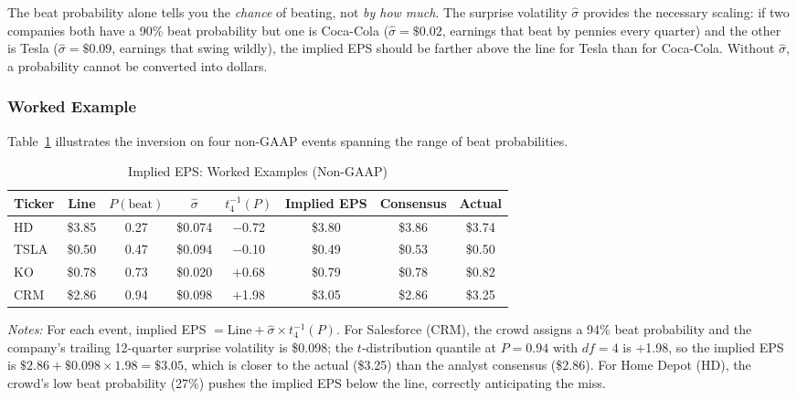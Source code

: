 \documentclass[11pt]{article}
\begin{document}
The beat probability alone tells you the \textit{chance} of beating, not \textit{by how much}. The surprise volatility $\hat{\sigma}$ provides the necessary scaling: if two companies both have a 90\% beat probability but one is Coca-Cola ($\hat{\sigma} = \$0.02$, earnings that beat by pennies every quarter) and the other is Tesla ($\hat{\sigma} = \$0.09$, earnings that swing wildly), the implied EPS should be farther above the line for Tesla than for Coca-Cola. Without $\hat{\sigma}$, a probability cannot be converted into dollars.

\subsubsection{Worked Example}

Table~\ref{tab:implied_example} illustrates the inversion on four non-GAAP events spanning the range of beat probabilities.

\begin{table}[htbp]
\centering
\begin{threeparttable}
\caption{Implied EPS: Worked Examples (Non-GAAP)}
\label{tab:implied_example}
\begin{tabular}{lccccccc}
\toprule
Ticker & Line & $P(\text{beat})$ & $\hat{\sigma}$ & $t^{-1}_4(P)$ & Implied EPS & Consensus & Actual \\
\midrule
HD & \$3.85 & 0.27 & \$0.074 & $-$0.72 & \$3.80 & \$3.86 & \$3.74 \\
TSLA & \$0.50 & 0.47 & \$0.094 & $-$0.10 & \$0.49 & \$0.53 & \$0.50 \\
KO & \$0.78 & 0.73 & \$0.020 & $+$0.68 & \$0.79 & \$0.78 & \$0.82 \\
CRM & \$2.86 & 0.94 & \$0.098 & $+$1.98 & \$3.05 & \$2.86 & \$3.25 \\
\bottomrule
\end{tabular}
\begin{tablenotes}
\small
\item \textit{Notes:} For each event, implied EPS $= \text{Line} + \hat{\sigma} \times t^{-1}_4(P)$. For Salesforce (CRM), the crowd assigns a 94\% beat probability and the company's trailing 12-quarter surprise volatility is \$0.098; the $t$-distribution quantile at $P = 0.94$ with $df = 4$ is $+$1.98, so the implied EPS is $\$2.86 + \$0.098 \times 1.98 = \$3.05$, which is closer to the actual (\$3.25) than the analyst consensus (\$2.86). For Home Depot (HD), the crowd's low beat probability (27\%) pushes the implied EPS below the line, correctly anticipating the miss.
\end{tablenotes}
\end{threeparttable}
\end{table}
\end{document}
